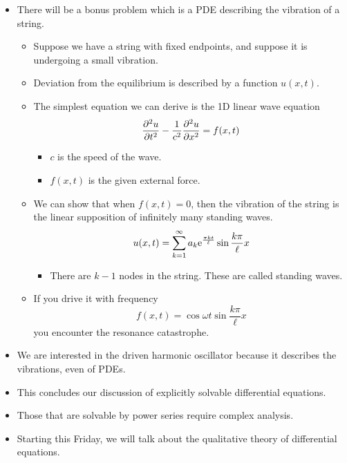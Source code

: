 \documentclass[../notes.tex]{subfiles}
\begin{document}
\begin{itemize}
\begin{itemize}
    \end{itemize}
    \item There will be a bonus problem which is a PDE describing the vibration of a string.
    \begin{itemize}
        \item Suppose we have a string with fixed endpoints, and suppose it is undergoing a small vibration.
        \item Deviation from the equilibrium is described by a function $u(x,t)$.
        \item The simplest equation we can derive is the 1D linear wave equation
        \begin{equation*}
            \pdv[2]{u}{t}-\frac{1}{c^2}\pdv[2]{u}{x} = f(x,t)
        \end{equation*}
        \begin{itemize}
            \item $c$ is the speed of the wave.
            \item $f(x,t)$ is the given external force.
        \end{itemize}
        \item We can show that when $f(x,t)=0$, then the vibration of the string is the linear supposition of infinitely many standing waves.
        \begin{equation*}
            u(x,t) = \sum_{k=1}^\infty a_k\e[\frac{\pi kt}{\ell}]\sin\frac{k\pi}{\ell}x
        \end{equation*}
        \begin{itemize}
            \item There are $k-1$ nodes in the string. These are called standing waves.
        \end{itemize}
        \item If you drive it with frequency
        \begin{equation*}
            f(x,t) = \cos\omega t\sin\frac{k\pi}{\ell}x
        \end{equation*}
        you encounter the resonance catastrophe.
    \end{itemize}
    \item We are interested in the driven harmonic oscillator because it describes the vibrations, even of PDEs.
    \item This concludes our discussion of explicitly solvable differential equations.
    \item Those that are solvable by power series require complex analysis.
    \item Starting this Friday, we will talk about the qualitative theory of differential equations.

\end{itemize}
\end{document}
